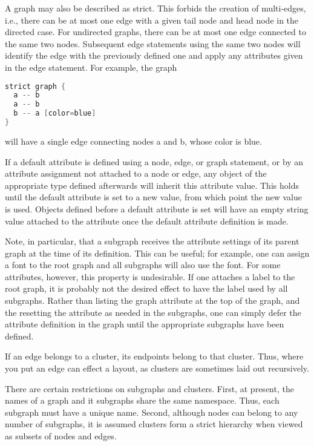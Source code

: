 A graph may also be described as strict. This 
forbids the creation of multi-edges, i.e., there 
can be at most one edge with a given tail node and 
head node in the directed case. For undirected 
graphs, there can be at most one edge connected to 
the same two nodes. Subsequent edge statements 
using the same two nodes will identify the edge 
with the previously defined one and apply any 
attributes given in the edge statement. For 
example, the graph
\begin{lstlisting}[language=C, style=mystyle]
strict graph { 
  a -- b
  a -- b
  b -- a [color=blue]
} 
\end{lstlisting}
will have a single edge connecting nodes a and b, 
whose color is blue.

If a default attribute is defined using a node, 
edge, or graph statement, or by an attribute 
assignment not attached to a node or edge, any 
object of the appropriate type defined afterwards 
will inherit this attribute value. This holds until 
the default attribute is set to a new value, from 
which point the new value is used. Objects defined 
before a default attribute is set will have an 
empty string value attached to the attribute once 
the default attribute definition is made.

Note, in particular, that a subgraph receives the 
attribute settings of its parent graph at the time 
of its definition. This can be useful; for example, 
one can assign a font to the root graph and all 
subgraphs will also use the font. For some 
attributes, however, this property is undesirable. 
If one attaches a label to the root graph, it is 
probably not the desired effect to have the label 
used by all subgraphs. Rather than listing the 
graph attribute at the top of the graph, and the 
resetting the attribute as needed in the subgraphs, 
one can simply defer the attribute definition in 
the graph until the appropriate subgraphs have been 
defined.

If an edge belongs to a cluster, its endpoints 
belong to that cluster. Thus, where you put an 
edge can effect a layout, as clusters are sometimes 
laid out recursively.

There are certain restrictions on subgraphs 
and clusters. First, at present, the names of a 
graph and it subgraphs share the same namespace. 
Thus, each subgraph must have a unique name. 
Second, although nodes can belong to any number 
of subgraphs, it is assumed clusters form a strict 
hierarchy when viewed as subsets of nodes and edges.

